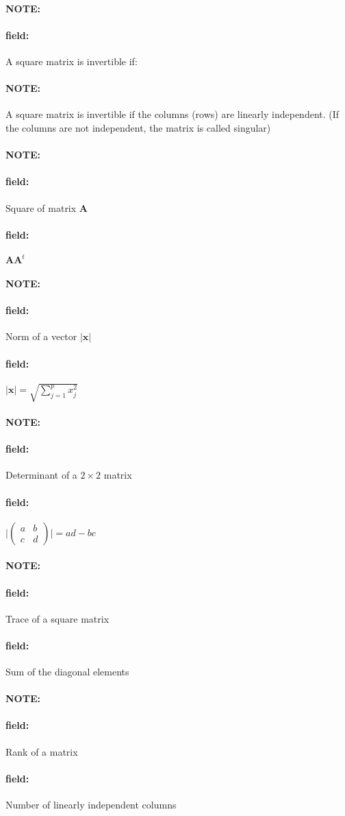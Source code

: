 \documentclass[12pt]{article}
\newenvironment{note}{\paragraph{NOTE:}}{}
\newenvironment{field}{\paragraph{field:}}{}
\begin{document}
\begin{note}
  \begin{field}
    A square matrix is invertible if:
  \end{field}
  \begin{note}
    A square matrix is invertible if the columns (rows) are linearly independent. (If the columns are not independent, the matrix is called singular)
  \end{note}
\end{note}

\begin{note}
  \begin{field}
    Square of matrix $\mathbf{A}$
  \end{field}
  \begin{field}
    $\mathbf{AA}^t$
  \end{field}
\end{note}

\begin{note}
  \begin{field}
    Norm of a vector $|\mathbf{x}|$
  \end{field}
  \begin{field}
    $|\mathbf{x}| = \sqrt{\sum_{j=1}^p x_j^2}$
  \end{field}
\end{note}

\begin{note}
  \begin{field}
    Determinant of a $2\times 2 $ matrix
  \end{field}
  \begin{field}
    $\bigg| \begin{pmatrix}
      a & b \\ c & d
    \end{pmatrix}\bigg| = ad - bc $
  \end{field}
\end{note}

\begin{note}
  \begin{field}
    Trace of a square matrix
  \end{field}
  \begin{field}
    Sum of the diagonal elements
  \end{field}
\end{note}

\begin{note}
  \begin{field}
    Rank of a matrix
  \end{field}
  \begin{field}
    Number of linearly independent columns
  \end{field}
\end{note}
\end{document}
